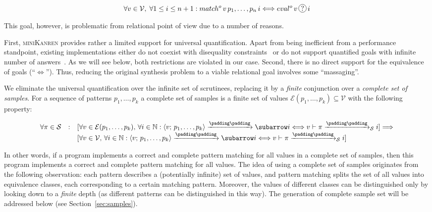 \[
\forall v\in \mathcal V,\; \forall 1\le i\le n+1 : match^o\,v\,p_1,\dots,p_n\,i\Longleftrightarrow eval^o\,v\,\circled{?}\,i
\]

\noindent This goal, however, is problematic from relational point of view due to a number of reasons.

First, \textsc{miniKanren} provides rather a limited support for universal quantification. Apart from being inefficient from
a performance standpoint, existing implementations either do not coexist with disequality constraints~\cite{eigen}
or do not support quantified goals with infinite number of answers~\cite{moiseenko}. As we will see below, both restrictions are
violated in our case. Second, there is no direct support for the equivalence of goals (``$\Leftrightarrow$''). Thus,
reducing the original synthesis problem to a viable relational goal involves some ``massaging''.

We eliminate the universal quantification over the infinite set of scrutinees, replacing it by a \emph{finite}
conjunction over a \emph{complete set of samples}. For a sequence of patterns $p_1,\dots,p_k$ a
complete set of samples is a finite set of values $\mathcal{E}(p_1,\dots,p_k)\subseteq\mathcal{V}$ with the following
property:

\[
\setarrow{\xrightarrow}
\begin{array}{rcl}
  \forall\pi\in\mathcal S & : & [\forall v\in\mathcal{E}(p_1,\dots,p_k),\,\forall i\in\mathbb{N} : \trans{\inbr{v;\,p_1,\dots,p_k}}{}{i} \Longleftrightarrow {\setsubarrow{_{\mathcal S}}\withenv{v}{\trans{\pi}{}{i}}}] \Longrightarrow \\
                          &   & [\forall v\in\mathcal V,\,\forall i\in\mathbb{N} : \trans{\inbr{v;\,p_1,\dots,p_k}}{}{i} \Longleftrightarrow  {\setsubarrow{_{\mathcal S}}\withenv{v}{\trans{\pi}{}{i}}}]
\end{array}
\]

In other words, if a program implements a correct and complete pattern matching for all values in a complete set of samples, then this
program implements a correct and complete pattern matching for all values. The idea of using a complete set of samples originates from the following observation: each pattern
describes a (potentially infinite) set of values, and pattern matching splits the set of all values into equivalence classes, each corresponding to a certain matching pattern.
Moreover, the values of different classes can be distinguished only by looking down to a \emph{finite} depth (as different patterns can be distinguished in this way).
The generation of complete sample set will be addressed below (see Section~\ref{sec:samples}).


